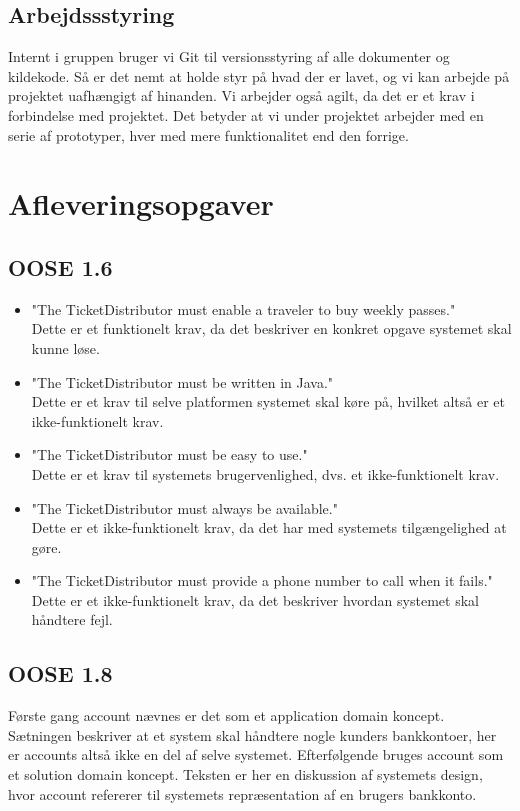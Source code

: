 \documentclass[12pt]{article}
\begin{document}
\subsection{Arbejdssstyring}
Internt i gruppen bruger vi Git til versionsstyring af alle dokumenter og kildekode. Så er det nemt at holde styr på hvad der er lavet, og vi kan arbejde på projektet uafhængigt af hinanden. Vi arbejder også agilt, da det er et krav i forbindelse med projektet. Det betyder at vi under projektet arbejder med en serie af prototyper, hver med mere funktionalitet end den forrige.

\section{Afleveringsopgaver}
\subsection{OOSE 1.6}
\begin{itemize}
\item "The TicketDistributor must enable a traveler to buy weekly passes." \\
  Dette er et funktionelt krav, da det beskriver en konkret opgave systemet skal kunne løse.
\item "The TicketDistributor must be written in Java." \\
  Dette er et krav til selve platformen systemet skal køre på, hvilket altså er et ikke-funktionelt krav.
\item "The TicketDistributor must be easy to use." \\
  Dette er et krav til systemets brugervenlighed, dvs. et ikke-funktionelt krav.
\item "The TicketDistributor must always be available." \\
  Dette er et ikke-funktionelt krav, da det har med systemets tilgængelighed at gøre.
\item "The TicketDistributor must provide a phone number to call when it fails." \\
  Dette er et ikke-funktionelt krav, da det beskriver hvordan systemet skal håndtere fejl.
\end{itemize}
\subsection{OOSE 1.8}
Første gang account nævnes er det som et application domain koncept. Sætningen beskriver at et system skal håndtere nogle kunders bankkontoer, her er accounts altså ikke en del af selve systemet. Efterfølgende bruges account som et solution domain koncept. Teksten er her en diskussion af systemets design, hvor account refererer til systemets repræsentation af en brugers bankkonto.
\end{document}
